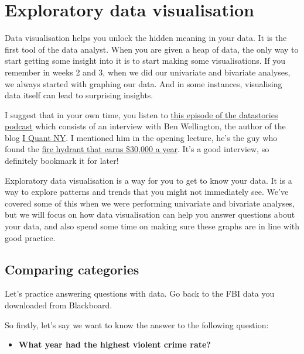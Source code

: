 \documentclass[]{book}
\providecommand{\tightlist}{%
  \setlength{\itemsep}{0pt}\setlength{\parskip}{0pt}}
\theoremstyle{definition}
\theoremstyle{definition}
\theoremstyle{definition}
\theoremstyle{remark}
\begin{document}
\hypertarget{exploratory-data-visualisation}{%
\section{Exploratory data
visualisation}\label{exploratory-data-visualisation}}

Data visualisation helps you unlock the hidden meaning in your data. It
is the first tool of the data analyst. When you are given a heap of
data, the only way to start getting some insight into it is to start
making some visualisations. If you remember in weeks 2 and 3, when we
did our univariate and bivariate analyses, we always started with
graphing our data. And in some instances, visualising data itself can
lead to surprising insights.

I suggest that in your own time, you listen to
\href{http://datastori.es/66-iquantnyc/}{this episode of the datastories
podcast} which consists of an interview with Ben Wellington, the author
of the blog \href{http://iquantny.tumblr.com/}{I Quant NY}. I mentioned
him in the opening lecture, he's the guy who found the
\href{http://iquantny.tumblr.com/post/87573867759/success-how-nyc-open-data-and-reddit-saved-new}{fire
hydrant that earns \$30,000 a year}. It's a good interview, so
definitely bookmark it for later!

Exploratory data visualisation is a way for you to get to know your
data. It is a way to explore patterns and trends that you might not
immediately see. We've covered some of this when we were performing
univariate and bivariate analyses, but we will focus on how data
visualisation can help you answer questions about your data, and also
spend some time on making sure these graphs are in line with good
practice.

\hypertarget{comparing-categories}{%
\subsection{Comparing categories}\label{comparing-categories}}

 Let's practice answering questions with data. Go back to the FBI data
you downloaded from Blackboard.

So firstly, let's say we want to know the answer to the following
question:

\begin{itemize}
\tightlist
\item
  \textbf{What year had the highest violent crime rate?}
\end{itemize}
\end{document}
